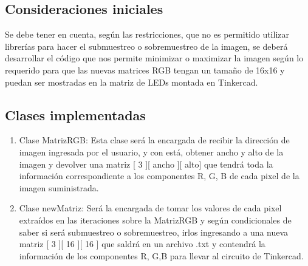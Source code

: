 \documentclass{article}
\begin{document}
\subsection{Consideraciones iniciales}

Se debe tener en cuenta, según las restricciones, que no es permitido utilizar librerías para hacer el submuestreo o sobremuestreo de la imagen, se deberá desarrollar el código que nos permite minimizar o maximizar la imagen según lo requerido para que las nuevas matrices RGB tengan un tamaño de 16x16 y puedan ser mostradas en la matriz de LEDs montada en Tinkercad.




\subsection{Clases implementadas}
\begin{enumerate}
\item Clase MatrizRGB: Esta clase será la encargada de recibir la dirección de imagen ingresada por el usuario, y con está, obtener ancho y alto de la imagen y devolver una matriz [ 3 ][ ancho ][ alto] que tendrá toda la información correspondiente a los componentes R, G, B de cada pixel de la imagen suministrada.
\item Clase newMatriz: Será la encargada de tomar los valores de cada pixel extraídos en las iteraciones sobre la MatrizRGB y según condicionales de saber si será submuestreo o sobremuestreo, irlos ingresando a una nueva matriz [ 3 ][ 16 ][ 16 ] que saldrá en un archivo .txt y contendrá la información de los componentes R, G,B para llevar al circuito de Tinkercad.


\end{enumerate}
\end{document}
